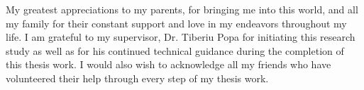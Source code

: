 \begin{acknowledgments}
  My greatest appreciations to my parents, for bringing me into this world, and all my family for their constant support and love in my endeavors throughout my life.
I am grateful to my supervisor, Dr. Tiberiu Popa for initiating this research study as well as for his continued technical guidance during the completion of this thesis work.
I would also wish to acknowledge all my friends who have volunteered their help through every step of my thesis work.
\end{acknowledgments}